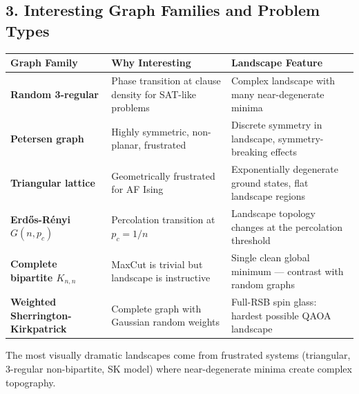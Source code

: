 \documentclass[
  11pt,
]{report}
\newcounter{none} %
\begin{document}
\subsection{3. Interesting Graph Families and Problem
Types}\label{interesting-graph-families-and-problem-types}

{\def\LTcaptype{none} %
\begin{longtable}[]{@{}
  >{\raggedright\arraybackslash}p{}
  >{\raggedright\arraybackslash}p{}
  >{\raggedright\arraybackslash}p{}@{}}
\toprule\noalign{}
\begin{minipage}[b]{\linewidth}\raggedright
Graph Family
\end{minipage} & \begin{minipage}[b]{\linewidth}\raggedright
Why Interesting
\end{minipage} & \begin{minipage}[b]{\linewidth}\raggedright
Landscape Feature
\end{minipage} \\
\midrule\noalign{}
\endhead
\bottomrule\noalign{}
\endlastfoot
\textbf{Random 3-regular} & Phase transition at clause density for
SAT-like problems & Complex landscape with many near-degenerate
minima \\
\textbf{Petersen graph} & Highly symmetric, non-planar, frustrated &
Discrete symmetry in landscape, symmetry-breaking effects \\
\textbf{Triangular lattice} & Geometrically frustrated for AF Ising &
Exponentially degenerate ground states, flat landscape regions \\
\textbf{Erdős-Rényi \(G(n, p_c)\)} & Percolation transition at
\(p_c = 1/n\) & Landscape topology changes at the percolation
threshold \\
\textbf{Complete bipartite \(K_{n,n}\)} & MaxCut is trivial but
landscape is instructive & Single clean global minimum --- contrast with
random graphs \\
\textbf{Weighted Sherrington-Kirkpatrick} & Complete graph with Gaussian
random weights & Full-RSB spin glass: hardest possible QAOA landscape \\
\end{longtable}
}

The most visually dramatic landscapes come from frustrated systems
(triangular, 3-regular non-bipartite, SK model) where near-degenerate
minima create complex topography.
\end{document}
